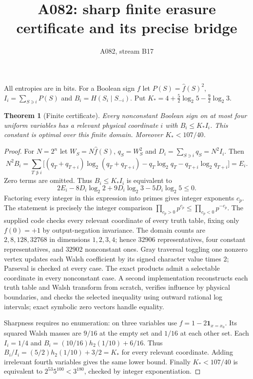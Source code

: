 \documentclass{article}
\newtheorem{theorem}{Theorem}
\begin{document}
\title{A082: sharp finite erasure certificate and its precise bridge}
\author{A082, stream B17}\maketitle
All entropies are in bits. For a Boolean sign $f$ let $P(S)=\widehat f(S)^2$,
$I_i=\sum_{S\ni i}P(S)$ and $B_i=H(S_i\mid S_{-i})$.
Put $K_*=4+\frac52\log_2 5-\frac92\log_2 3$.

\begin{theorem}[Finite certificate]
Every nonconstant Boolean sign on at most four uniform variables has a relevant
physical coordinate $i$ with $B_i\le K_* I_i$. This constant is optimal over
this finite domain. Moreover $K_*<107/40$.
\end{theorem}
\begin{proof}
For $N=2^n$ let $W_S=N\widehat f(S)$, $q_S=W_S^2$ and
$D_i=\sum_{S\ni i}q_S=N^2I_i$. Then
\[
 N^2 B_i=\sum_{T\not\ni i}\big[(q_T+q_{T+i})\log_2(q_T+q_{T+i})
 -q_T\log_2 q_T-q_{T+i}\log_2 q_{T+i}\big]=E_i.
\]
Zero terms are omitted. Thus $B_i\le K_*I_i$ is equivalent to
\[
 2E_i-8D_i\log_2 2+9D_i\log_2 3-5D_i\log_2 5\le0.
\]
Factoring every integer in this expression into primes gives integer exponents
$c_p$. The statement is precisely the integer comparison
$\prod_{c_p>0}p^{c_p}\le\prod_{c_p<0}p^{-c_p}$.
The supplied code checks every relevant coordinate of every truth table,
fixing only $f(0)=+1$ by output-negation invariance. The domain counts are
$2,8,128,32768$ in dimensions $1,2,3,4$; hence $32906$ representatives,
four constant representatives, and $32902$ nonconstant ones. Gray traversal
toggling one nonzero vertex updates each Walsh coefficient by its signed
character value times $2$; Parseval is checked at every case. The exact products
admit a selectable coordinate in every nonconstant case. A second implementation
reconstructs each truth table and Walsh transform from scratch, verifies influence
by physical boundaries, and checks the selected inequality using outward rational
log intervals; exact symbolic zero vectors handle equality.

Sharpness requires no enumeration: on three variables use $f=1-2\mathbf1_{x=x_0}$.
Its squared Walsh masses are $9/16$ at the empty set and $1/16$ at each other set.
Each $I_i=1/4$ and
$B_i=(10/16)h_2(1/10)+6/16$.
Thus $B_i/I_i=(5/2)h_2(1/10)+3/2=K_*$ for every relevant coordinate.
Adding irrelevant fourth variables gives the same lower bound. Finally
$K_*<107/40$ is equivalent to $2^{53}5^{100}<3^{180}$,
checked by integer exponentiation.
\end{proof}
\end{document}
